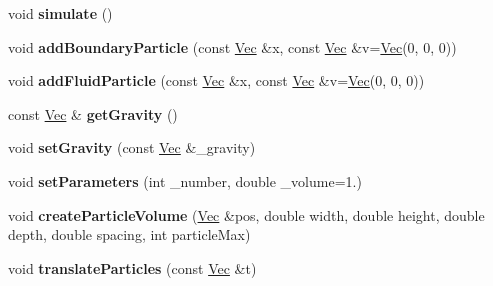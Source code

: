 \begin{DoxyCompactItemize}
\item 
\hypertarget{classhokusai_1_1System_a5f610d18b2e156efa68714eb56b2a71b}{void {\bfseries simulate} ()}\label{classhokusai_1_1System_a5f610d18b2e156efa68714eb56b2a71b}

\item 
\hypertarget{classhokusai_1_1System_ab1ae8b4b1cbed97eee6a4d141f9b7202}{void {\bfseries add\+Boundary\+Particle} (const \hyperlink{classhokusai_1_1Vec3}{Vec} \&x, const \hyperlink{classhokusai_1_1Vec3}{Vec} \&v=\hyperlink{classhokusai_1_1Vec3}{Vec}(0, 0, 0))}\label{classhokusai_1_1System_ab1ae8b4b1cbed97eee6a4d141f9b7202}

\item 
\hypertarget{classhokusai_1_1System_ac1eb0ec0639794d33433da30947931fe}{void {\bfseries add\+Fluid\+Particle} (const \hyperlink{classhokusai_1_1Vec3}{Vec} \&x, const \hyperlink{classhokusai_1_1Vec3}{Vec} \&v=\hyperlink{classhokusai_1_1Vec3}{Vec}(0, 0, 0))}\label{classhokusai_1_1System_ac1eb0ec0639794d33433da30947931fe}

\item 
\hypertarget{classhokusai_1_1System_adfd39e4458c17585f416476fd326da96}{const \hyperlink{classhokusai_1_1Vec3}{Vec} \& {\bfseries get\+Gravity} ()}\label{classhokusai_1_1System_adfd39e4458c17585f416476fd326da96}

\item 
\hypertarget{classhokusai_1_1System_a0e5239e88b09033d3cb741f4e81650e3}{void {\bfseries set\+Gravity} (const \hyperlink{classhokusai_1_1Vec3}{Vec} \&\+\_\+gravity)}\label{classhokusai_1_1System_a0e5239e88b09033d3cb741f4e81650e3}

\item 
\hypertarget{classhokusai_1_1System_add27dc99988b76deba23f930692dafa7}{void {\bfseries set\+Parameters} (int \+\_\+number, double \+\_\+volume=1.)}\label{classhokusai_1_1System_add27dc99988b76deba23f930692dafa7}

\item 
\hypertarget{classhokusai_1_1System_a113840a2f2333719576eefcc02be0af4}{void {\bfseries create\+Particle\+Volume} (\hyperlink{classhokusai_1_1Vec3}{Vec} \&pos, double width, double height, double depth, double spacing, int particle\+Max)}\label{classhokusai_1_1System_a113840a2f2333719576eefcc02be0af4}

\item 
\hypertarget{classhokusai_1_1System_aef8fadaa38d9e784e9c73d294be3eccd}{void {\bfseries translate\+Particles} (const \hyperlink{classhokusai_1_1Vec3}{Vec} \&t)}\label{classhokusai_1_1System_aef8fadaa38d9e784e9c73d294be3eccd}


\end{DoxyCompactItemize}
